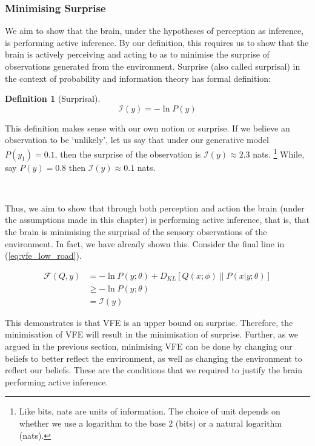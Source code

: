 \documentclass{article}
\newcommand{\refp}[1]{(\ref{#1})}
\newtheorem{definition}{Definition}
\begin{document}
\subsubsection{Minimising Surprise}

We aim to show that the brain, under the hypotheses of perception as inference, is performing active inference. By our definition, this requires us to show that the brain is actively perceiving and acting to as to minimise the surprise of observations generated from the environment. Surprise (also called surprisal) in the context of probability and information theory has formal definition:

\begin{definition}[Surprisal]\label{eq:surprisal}
	$$\mathcal{I}(y) = - \ln P(y)$$
\end{definition}

This definition makes sense with our own notion or surprise. If we believe an observation to be `unlikely', let us say that under our generative model $P(y_1) = 0.1$, then the surprise of the observation is $ \mathcal{I}(y) \approx 2.3$ nats. \footnote{Like bits, nats are units of information. The choice of unit depends on whether we use a logarithm to the base 2 (bits) or a natural logarithm (nats).} While, say $P(y) = 0.8$ then $\mathcal{I}(y) \approx 0.1$ nats. 

\

Thus, we aim to show that through both perception and action the brain (under the assumptions made in this chapter) is performing active inference, that is, that the brain is minimising the surprisal of the sensory observations of the environment. In fact, we have already shown this. Consider the final line in \refp{eq:vfe_low_road}. 

\begin{equation}
	\begin{aligned}
		\mathcal{F}(Q, y) &= - \ln P(y; \theta) + D_{KL}\left[ Q(x; \phi) \| P(x | y; \theta) \right] \\
		&\geq - \ln P(y; \theta) \\
		&= \mathcal{I}(y)
	\end{aligned}
\end{equation}

This demonstrates is that VFE is an upper bound on surprise. Therefore, the minimisation of VFE will result in the minimisation of surprise. Further, as we argued in the previous section, minimising VFE can be done by changing our beliefs to better reflect the environment, as well as changing the environment to reflect our beliefs. These are the conditions that we required to justify the brain performing active inference. 
\end{document}
